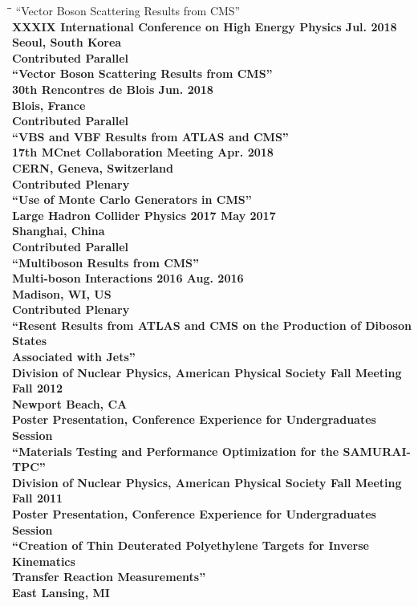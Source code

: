\documentclass[10pt]{res} %
\begin{document}
\begin{resume}
\begin{tabbing}
\hspace{2.3in}\= \hspace{2.6in}\= \kill %
``Vector Boson Scattering Results from CMS'' \\
\bf{XXXIX International Conference on High Energy Physics} 		 \> \>	    Jul. 2018 \\
Seoul, South Korea\\
Contributed Parallel\\ 
``Vector Boson Scattering Results from CMS'' \\
\bf{30th Rencontres de Blois} 		 \> \>	    Jun. 2018 \\
Blois, France\\
Contributed Parallel\\ 
``VBS and VBF Results from ATLAS and CMS'' \\
\bf{17th MCnet Collaboration Meeting} 		 \> \>	    Apr. 2018 \\
CERN, Geneva, Switzerland \\
Contributed Plenary\\ 
``Use of Monte Carlo Generators in CMS'' \\
\bf{Large Hadron Collider Physics 2017} 		 \> \>	    May 2017 \\
Shanghai, China \\
Contributed Parallel \\ 
``Multiboson Results from CMS'' \\

\bf{Multi-boson Interactions 2016} 		 \> \>	    Aug. 2016 \\
Madison, WI, US \\
Contributed Plenary \\ 
``Resent Results from ATLAS and CMS on the Production of Diboson States \\Associated with Jets'' \\
\bf{Division of Nuclear Physics, American Physical Society Fall Meeting} 		 \> \>	    Fall 2012 \\
Newport Beach, CA \\
Poster Presentation, Conference Experience for Undergraduates Session\\ 
``Materials Testing and Performance Optimization for the SAMURAI-TPC'' \\
\bf{Division of Nuclear Physics, American Physical Society Fall Meeting} 		 \> \>	    Fall 2011 \\
Poster Presentation, Conference Experience for Undergraduates Session\\ 
``Creation of Thin Deuterated Polyethylene Targets for Inverse Kinematics \\Transfer Reaction Measurements'' \\
East Lansing, MI \\
\end{tabbing}


\end{resume}
\end{document}
